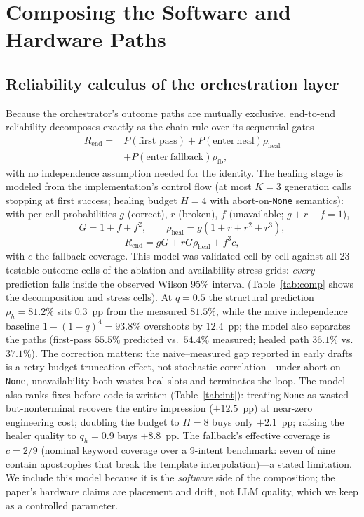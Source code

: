 \documentclass[journal,10pt,twocolumn]{IEEEtran}
\begin{document}
\section{Composing the Software and Hardware Paths}
\label{sec:e2e}
\subsection{Reliability calculus of the orchestration layer}
\label{sec:calculus}
Because the orchestrator's outcome paths are mutually exclusive, end-to-end reliability decomposes exactly as the
chain rule over its sequential gates
\begin{equation}\begin{split}
R_{\mathrm{end}}={}&P(\mathrm{first\_pass})+P(\mathrm{enter\ heal})\rho_{\mathrm{heal}}\\
&+P(\mathrm{enter\ fallback})\rho_{\mathrm{fb}},
\end{split}\label{eq:composition}
\end{equation}
with no independence assumption needed for the identity. The healing stage is modeled from the implementation's
control flow (at most $K{=}3$ generation calls stopping at first success; healing budget $H{=}4$ with
abort-on-\texttt{None} semantics): with per-call probabilities $g$ (correct), $r$ (broken), $f$ (unavailable;
$g{+}r{+}f{=}1$),
\begin{equation}
G=1+f+f^{2},\qquad \rho_{\mathrm{heal}}=g(1+r+r^{2}+r^{3}),
\label{eq:gamel}
\end{equation}
\begin{equation}
R_{\mathrm{end}}=gG+rG\rho_{\mathrm{heal}}+f^{3}c,
\label{eq:rheal}
\end{equation}
with $c$ the fallback coverage. This model was validated cell-by-cell against all 23 testable outcome cells of the
ablation and availability-stress grids: \emph{every} prediction falls inside the observed Wilson 95\% interval
(Table~\ref{tab:comp} shows the decomposition and stress cells). At $q{=}0.5$ the structural prediction
$\rho_h{=}81.2\%$ sits $0.3$~pp from the measured $81.5\%$, while the naive independence baseline
$1-(1-q)^{4}{=}93.8\%$ overshoots by $12.4$~pp; the model also separates the paths (first-pass $55.5\%$
predicted vs.\ $54.4\%$ measured; healed path $36.1\%$ vs.\ $37.1\%$). The correction matters: the
naive--measured gap reported in early drafts is a retry-budget truncation effect, not stochastic
correlation---under abort-on-\texttt{None}, unavailability both wastes heal slots and terminates the loop.
The model also ranks fixes before code is written (Table~\ref{tab:int}): treating \texttt{None} as
wasted-but-nonterminal recovers the entire impression ($+12.5$~pp) at near-zero engineering cost; doubling the
budget to $H{=}8$ buys only $+2.1$~pp; raising the healer quality to $q_h{=}0.9$ buys $+8.8$~pp. The fallback's
effective coverage is $c{=}2/9$ (nominal keyword coverage over a 9-intent benchmark: seven of nine contain
apostrophes that break the template interpolation)---a stated limitation. We include this model because it is the
\emph{software} side of the composition; the paper's hardware claims are placement and drift, not LLM quality,
which we keep as a controlled parameter.
\end{document}
